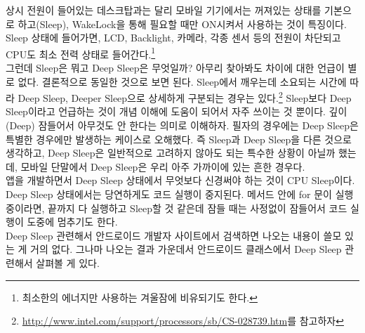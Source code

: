 상시 전원이 들어있는 데스크탑과는 달리 모바일 기기에서는 꺼져있는 상태를 기본으로 하고(Sleep), WakeLock을 통해 필요할 때만 ON시켜서 사용하는 것이 특징이다.
Sleep 상태에 들어가면, LCD, Backlight, 카메라, 각종 센서 등의 전원이 차단되고 CPU도 최소 전력 상태로 들어간다.\footnote{최소한의 에너지만 사용하는 겨울잠에 비유되기도 한다.}\\ 

그런데 Sleep은 뭐고 Deep Sleep은 무엇일까? 아무리 찾아봐도 차이에 대한 언급이 별로 없다. 결론적으로 동일한 것으로 보면 된다. 
Sleep에서 깨우는데 소요되는 시간에 따라 Deep Sleep, Deeper Sleep으로 상세하게 구분되는 경우는 있다.\footnote{\url{http://www.intel.com/support/processors/sb/CS-028739.htm}를 참고하자}
Sleep보다 Deep Sleep이라고 언급하는 것이 개념 이해에 도움이 되어서 자주 쓰이는 것 뿐이다. 
깊이(Deep) 잠들어서 아무것도 안 한다는 의미로 이해하자.
필자의 경우에는 Deep Sleep은 특별한 경우에만 발생하는 케이스로 오해했다. 
즉 Sleep과 Deep Sleep을 다른 것으로 생각하고, Deep Sleep은 일반적으로 고려하지 않아도 되는 특수한 상황이 아닐까 했는데, 모바일 단말에서 Deep Sleep은 우리 아주 가까이에 있는 흔한 경우다.\\

앱을 개발하면서 Deep Sleep 상태에서 무엇보다 신경써야 하는 것이 CPU Sleep이다.
Deep Sleep 상태에서는 당연하게도 코드 실행이 중지된다. 메서드 안에 for 문이 실행 중이라면, 끝까지 다 실행하고 Sleep할 것 같은데 잠들 때는 사정없이 잠들어서 코드 실행이 도중에 멈추기도 한다.\\

Deep Sleep 관련해서 안드로이드 개발자 사이트에서 검색하면 나오는 내용이 쓸모 있는 게 거의 없다. 그나마 나오는 결과 가운데서 안드로이드 클래스에서 Deep Sleep 관련해서 살펴볼 게 있다.


